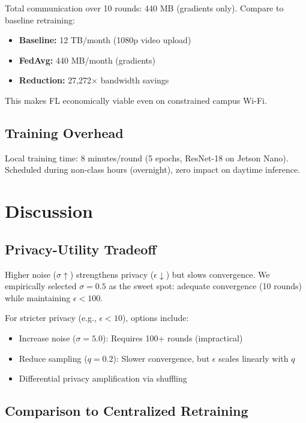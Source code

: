 \documentclass[conference]{IEEEtran}
\begin{document}
Total communication over 10 rounds: 440 MB (gradients only). Compare to baseline retraining:
\begin{itemize}
    \item \textbf{Baseline:} 12 TB/month (1080p video upload)
    \item \textbf{FedAvg:} 440 MB/month (gradients)
    \item \textbf{Reduction:} 27,272$\times$ bandwidth savings
\end{itemize}

This makes FL economically viable even on constrained campus Wi-Fi.

\subsection{Training Overhead}

Local training time: 8 minutes/round (5 epochs, ResNet-18 on Jetson Nano). Scheduled during non-class hours (overnight), zero impact on daytime inference.

\section{Discussion}

\subsection{Privacy-Utility Tradeoff}

Higher noise ($\sigma \uparrow$) strengthens privacy ($\epsilon \downarrow$) but slows convergence. We empirically selected $\sigma=0.5$ as the sweet spot: adequate convergence (10 rounds) while maintaining $\epsilon < 100$.

For stricter privacy (e.g., $\epsilon < 10$), options include:
\begin{itemize}
    \item Increase noise ($\sigma=5.0$): Requires 100+ rounds (impractical)
    \item Reduce sampling ($q=0.2$): Slower convergence, but $\epsilon$ scales linearly with $q$
    \item Differential privacy amplification via shuffling \cite{erlingsson2019}
\end{itemize}

\subsection{Comparison to Centralized Retraining}
\end{document}
